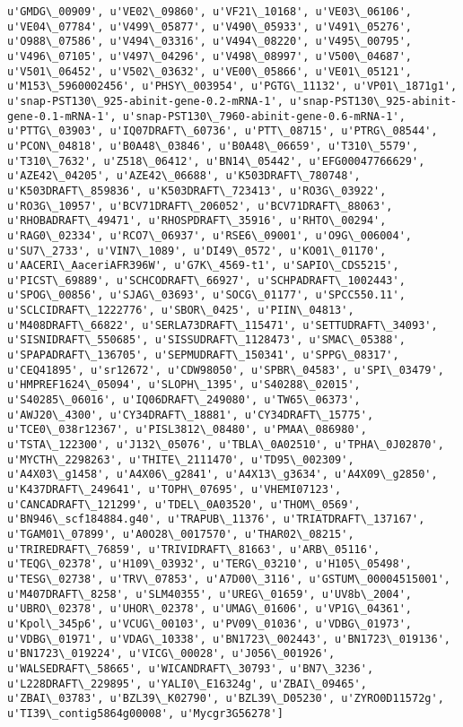 \documentclass[11pt]{article}
\begin{document}
\begin{Verbatim}[commandchars=\\\{\}]
u'GMDG\_00909', u'VE02\_09860', u'VF21\_10168', u'VE03\_06106', u'VE04\_07784', u'V499\_05877', u'V490\_05933', u'V491\_05276', u'O988\_07586', u'V494\_03316', u'V494\_08220', u'V495\_00795', u'V496\_07105', u'V497\_04296', u'V498\_08997', u'V500\_04687', u'V501\_06452', u'V502\_03632', u'VE00\_05866', u'VE01\_05121', u'M153\_5960002456', u'PHSY\_003954', u'PGTG\_11132', u'VP01\_1871g1', u'snap-PST130\_925-abinit-gene-0.2-mRNA-1', u'snap-PST130\_925-abinit-gene-0.1-mRNA-1', u'snap-PST130\_7960-abinit-gene-0.6-mRNA-1', u'PTTG\_03903', u'IQ07DRAFT\_60736', u'PTT\_08715', u'PTRG\_08544', u'PCON\_04818', u'B0A48\_03846', u'B0A48\_06659', u'T310\_5579', u'T310\_7632', u'Z518\_06412', u'BN14\_05442', u'EFG00047766629', u'AZE42\_04205', u'AZE42\_06688', u'K503DRAFT\_780748', u'K503DRAFT\_859836', u'K503DRAFT\_723413', u'RO3G\_03922', u'RO3G\_10957', u'BCV71DRAFT\_206052', u'BCV71DRAFT\_88063', u'RHOBADRAFT\_49471', u'RHOSPDRAFT\_35916', u'RHTO\_00294', u'RAG0\_02334', u'RCO7\_06937', u'RSE6\_09001', u'O9G\_006004', u'SU7\_2733', u'VIN7\_1089', u'DI49\_0572', u'KO01\_01170', u'AACERI\_AaceriAFR396W', u'G7K\_4569-t1', u'SAPIO\_CDS5215', u'PICST\_69889', u'SCHCODRAFT\_66927', u'SCHPADRAFT\_1002443', u'SPOG\_00856', u'SJAG\_03693', u'SOCG\_01177', u'SPCC550.11', u'SCLCIDRAFT\_1222776', u'SBOR\_0425', u'PIIN\_04813', u'M408DRAFT\_66822', u'SERLA73DRAFT\_115471', u'SETTUDRAFT\_34093', u'SISNIDRAFT\_550685', u'SISSUDRAFT\_1128473', u'SMAC\_05388', u'SPAPADRAFT\_136705', u'SEPMUDRAFT\_150341', u'SPPG\_08317', u'CEQ41895', u'sr12672', u'CDW98050', u'SPBR\_04583', u'SPI\_03479', u'HMPREF1624\_05094', u'SLOPH\_1395', u'S40288\_02015', u'S40285\_06016', u'IQ06DRAFT\_249080', u'TW65\_06373', u'AWJ20\_4300', u'CY34DRAFT\_18881', u'CY34DRAFT\_15775', u'TCE0\_038r12367', u'PISL3812\_08480', u'PMAA\_086980', u'TSTA\_122300', u'J132\_05076', u'TBLA\_0A02510', u'TPHA\_0J02870', u'MYCTH\_2298263', u'THITE\_2111470', u'TD95\_002309', u'A4X03\_g1458', u'A4X06\_g2841', u'A4X13\_g3634', u'A4X09\_g2850', u'K437DRAFT\_249641', u'TOPH\_07695', u'VHEMI07123', u'CANCADRAFT\_121299', u'TDEL\_0A03520', u'THOM\_0569', u'BN946\_scf184884.g40', u'TRAPUB\_11376', u'TRIATDRAFT\_137167', u'TGAM01\_07899', u'A0O28\_0017570', u'THAR02\_08215', u'TRIREDRAFT\_76859', u'TRIVIDRAFT\_81663', u'ARB\_05116', u'TEQG\_02378', u'H109\_03932', u'TERG\_03210', u'H105\_05498', u'TESG\_02738', u'TRV\_07853', u'A7D00\_3116', u'GSTUM\_00004515001', u'M407DRAFT\_8258', u'SLM40355', u'UREG\_01659', u'UV8b\_2004', u'UBRO\_02378', u'UHOR\_02378', u'UMAG\_01606', u'VP1G\_04361', u'Kpol\_345p6', u'VCUG\_00103', u'PV09\_01036', u'VDBG\_01973', u'VDBG\_01971', u'VDAG\_10338', u'BN1723\_002443', u'BN1723\_019136', u'BN1723\_019224', u'VICG\_00028', u'J056\_001926', u'WALSEDRAFT\_58665', u'WICANDRAFT\_30793', u'BN7\_3236', u'L228DRAFT\_229895', u'YALI0\_E16324g', u'ZBAI\_09465', u'ZBAI\_03783', u'BZL39\_K02790', u'BZL39\_D05230', u'ZYRO0D11572g', u'TI39\_contig5864g00008', u'Mycgr3G56278']

\end{Verbatim}
\end{document}
